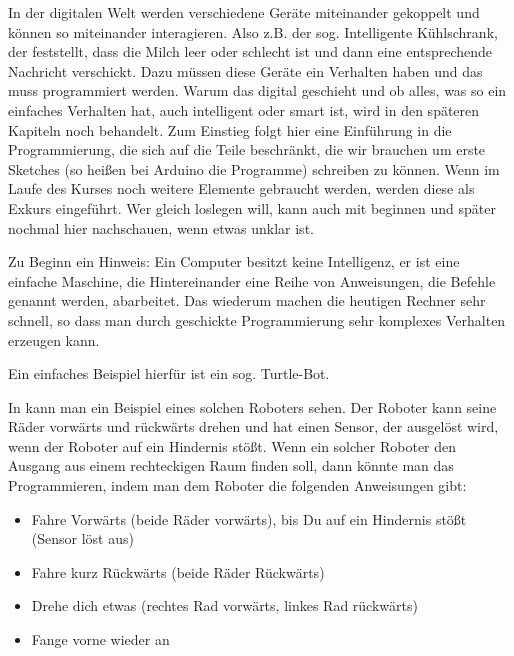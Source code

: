 
In der digitalen Welt werden verschiedene Geräte miteinander gekoppelt und können so miteinander interagieren. Also z.B. der sog. Intelligente Kühlschrank, der feststellt, dass die Milch leer oder schlecht ist und dann eine entsprechende Nachricht verschickt. Dazu müssen diese Geräte ein Verhalten haben und das muss programmiert werden. Warum das digital geschieht und ob alles, was so ein einfaches Verhalten hat, auch intelligent oder smart ist, wird in den späteren Kapiteln noch behandelt. Zum Einstieg folgt hier eine Einführung in die Programmierung, die sich auf die Teile beschränkt, die wir brauchen um erste Sketches (so heißen bei Arduino die Programme) schreiben zu können. Wenn im Laufe des Kurses noch weitere Elemente gebraucht werden, werden diese als Exkurs eingeführt. Wer gleich loslegen will, kann auch mit  beginnen und später nochmal hier nachschauen, wenn etwas unklar ist.


Zu Beginn ein Hinweis: Ein Computer besitzt keine Intelligenz, er ist eine einfache Maschine, die Hintereinander eine Reihe von Anweisungen, die Befehle genannt werden, abarbeitet. Das wiederum machen die heutigen Rechner sehr schnell, so dass man durch geschickte Programmierung sehr komplexes Verhalten erzeugen kann.



Ein einfaches Beispiel hierfür ist ein sog. Turtle-Bot.

In  kann man ein Beispiel eines solchen Roboters sehen. Der Roboter kann seine Räder vorwärts und rückwärts drehen und hat einen Sensor, der ausgelöst wird, wenn der Roboter auf ein Hindernis stößt. 
\vfill\null\pagebreak
Wenn ein solcher Roboter den Ausgang aus einem rechteckigen Raum finden soll, dann könnte man das Programmieren, indem man dem Roboter die folgenden 
Anweisungen gibt:
\begin{itemize}
\item Fahre Vorwärts (beide Räder vorwärts), bis Du auf ein Hindernis stößt (Sensor löst aus)
\item Fahre kurz Rückwärts (beide Räder Rückwärts)
\item Drehe dich etwas (rechtes Rad vorwärts, linkes Rad rückwärts)
\item Fange vorne wieder an
\end{itemize}
\vfill\null\columnbreak

